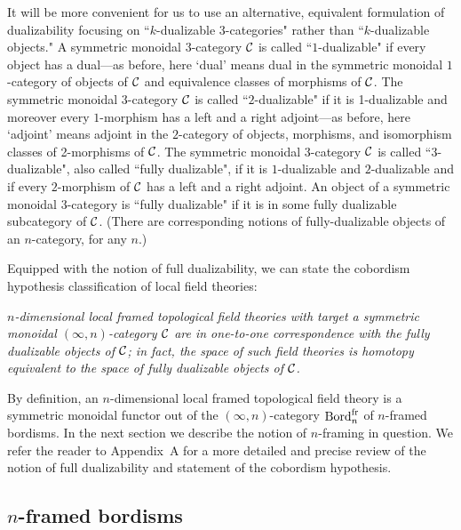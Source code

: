 \documentclass{amsart}
\begin{document}
It will be more convenient for us to use an alternative, equivalent formulation of dualizability focusing on ``$k$-dualizable $3$-categories" rather than ``$k$-dualizable objects."  A symmetric monoidal $3$-category $\mathcal C$ is called ``$1$-dualizable" if every object has a dual---as before, here `dual' means dual in the symmetric monoidal $1$-category of objects of $\mathcal C$ and equivalence classes of morphisms of $\mathcal C$.  The symmetric monoidal $3$-category $\mathcal C$ is called ``$2$-dualizable" if it is 1-dualizable and moreover every $1$-morphism has a left and a right adjoint---as before, here `adjoint' means adjoint in the $2$-category of objects, morphisms, and isomorphism classes of 2-morphisms of $\mathcal C$.  The symmetric monoidal $3$-category $\mathcal C$ is called ``$3$-dualizable", also called ``fully dualizable", if it is $1$-dualizable and $2$-dualizable and if every $2$-morphism of $\mathcal C$ has a left and a right adjoint.  An object of a symmetric monoidal $3$-category is ``fully dualizable" if it is in some fully dualizable subcategory of $\mathcal C$.  (There are corresponding notions of fully-dualizable objects of an $n$-category, for any $n$.)

Equipped with the notion of full dualizability, we can state the cobordism hypothesis classification of local field theories: \vspace{7pt}

\setlength{\leftskip}{.75cm}

 \emph{$n$-dimensional local framed topological field theories with target a symmetric monoidal $(\infty,n)$-category $\mathcal C$ are in one-to-one correspondence with the fully dualizable objects of $\mathcal C$; in fact, the space of such field theories is homotopy equivalent to the space of fully dualizable objects of $\mathcal C$.} \vspace{7pt}

\setlength{\leftskip}{0cm}

\nid By definition, an $n$-dimensional local framed topological field theory is a symmetric monoidal functor out of the $(\infty,n)$-category $\mathrm{Bord}^\mathrm{fr}_n$ of $n$-framed bordisms.  In the next section we describe the notion of $n$-framing in question.  We refer the reader to Appendix~A for a more detailed and precise review of the notion of full dualizability and statement of the cobordism hypothesis.  

\subsection{$n$-framed bordisms} \label{sec:notation}
\end{document}
